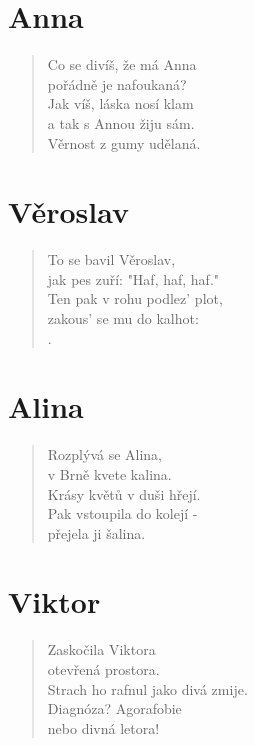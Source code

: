 \section*{Anna}
\begin{verse}
Co se divíš, že má Anna\\
pořádně je nafoukaná?\\
Jak víš, láska nosí klam\\
a tak s Annou žiju sám.\\
Věrnost z gumy udělaná.
\end{verse}    

\section*{Věroslav}
\begin{verse}
To se bavil Věroslav,\\
jak pes zuří: "Haf, haf, haf."\\
Ten pak v rohu podlez' plot,\\
zakous' se mu do kalhot:\\
.
\end{verse}    

\section*{Alina}
\begin{verse}
Rozplývá se Alina,\\
v Brně kvete kalina.\\
Krásy květů v duši hřejí.\\
Pak vstoupila do kolejí -\\
přejela ji šalina.
\end{verse}    

\section*{Viktor}
\begin{verse}
Zaskočila Viktora\\
otevřená prostora.\\
Strach ho rafnul jako divá zmije.\\
Diagnóza? Agorafobie\\
nebo divná letora!
\end{verse}    

